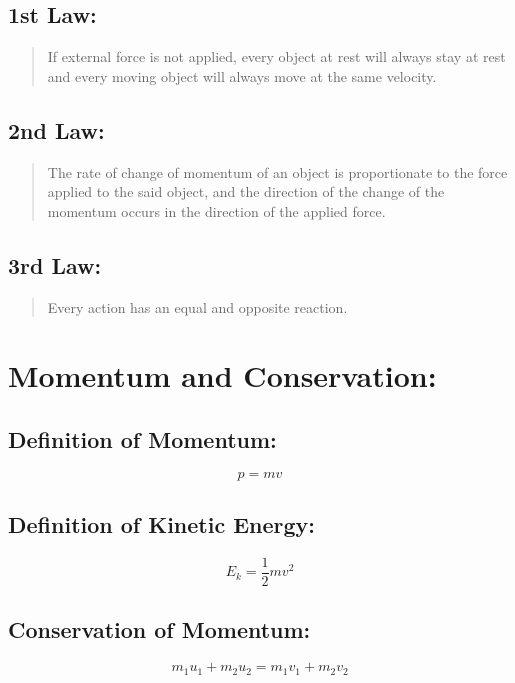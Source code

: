 \documentclass[a4paper]{report}
\begin{document}
        \subsection{1st Law: }
            \begin{quotation}
                \item If external force is not applied, every object at rest will always stay at rest and every moving object will always move at the same velocity.
            \end{quotation}
        \subsection{2nd Law: }
            \begin{quotation}
                \item The rate of change of momentum of an object is proportionate to the force applied to the said object, and the direction of the change of the momentum occurs in the direction of the applied force.
            \end{quotation}
        \subsection{3rd Law: }
            \begin{quotation}
                \item Every action has an equal and opposite reaction.
            \end{quotation}
    
    \section{Momentum and Conservation: }
        \subsection{Definition of Momentum: }
            \begin{equation}
                p = mv
            \end{equation}
        \subsection{Definition of Kinetic Energy: }
            \begin{equation}
                E_k = \frac{1}{2}m v^2
            \end{equation}
        \subsection{Conservation of Momentum: }
            \begin{equation}
                m_1 u_1 + m_2 u_2 = m_1 v_1 + m_2 v_2
            \end{equation}
\end{document}
